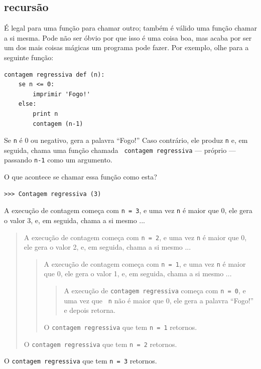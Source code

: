 \documentclass[10pt]{book}
\begin{document}
\begin{exercise}
{\section{recursão}
\label{recursão}

É legal para uma função para chamar outro;
também é válido uma função chamar a si mesma. Pode não ser óbvio
por que isso é uma coisa boa, mas acaba por ser um dos mais
coisas mágicas um programa pode fazer.
Por exemplo, olhe para a seguinte função:

\begin{verbatim}
contagem regressiva def (n):
    se n <= 0:
        imprimir 'Fogo!'
    else:
        print n
        contagem (n-1)
\end{verbatim}
%
Se {\tt n} é 0 ou negativo, gera a palavra ``Fogo!''
Caso contrário, ele produz {\tt n} e, em seguida, chama uma função chamada {\tt
contagem regressiva} --- próprio --- passando {\tt n-1} como um argumento.

O que acontece se chamar essa função como esta?

\begin{verbatim}
>>> Contagem regressiva (3)
\end{verbatim}
%
A execução de {\tt} contagem começa com {\tt n = 3}, e uma vez
{\tt n} é maior que 0, ele gera o valor 3, e, em seguida, chama a si mesmo ...

\begin{quote}
A execução de {\tt} contagem começa com {\tt n = 2}, e uma vez
{\tt n} é maior que 0, ele gera o valor 2, e, em seguida, chama a si mesmo ...

\begin{quote}
A execução de {\tt} contagem começa com {\tt n = 1}, e uma vez
{\tt n} é maior que 0, ele gera o valor 1, e, em seguida, chama a si mesmo ...

\begin{quote}
A execução de {\tt contagem regressiva} começa com {\tt n = 0}, e uma vez que {\tt
n} não é maior que 0, ele gera a palavra ``Fogo!'' e depois
retorna.
\end{quote}

O {\tt contagem regressiva} que tem {\tt n = 1} retornos.
\end{quote}

O {\tt contagem regressiva} que tem {\tt n = 2} retornos.
\end{quote}

O {\tt contagem regressiva} que tem {\tt n = 3} retornos.

}
\end{exercise}
\end{document}
